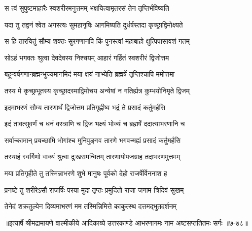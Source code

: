 \twolineshloka
{स त्वं सुपुष्टमाहारैः स्वशरीरमनुत्तमम्}
{भक्षयित्वामृतरसं तेन तृप्तिर्भविष्यति} %

\twolineshloka
{यदा तु तद्वनं श्वेत अगस्त्यः सुमहानृषिः}
{आगमिष्यति दुर्धर्षस्तदा कृच्छ्राद्विमोक्ष्यते} %

\twolineshloka
{स हि तारयितुं सौम्य शक्तः सुरगणानपि}
{किं पुनस्त्वां महाबाहो क्षुत्पिपासावशं गतम्} %

\twolineshloka
{सोऽहं भगवतः श्रुत्वा देवदेवस्य निश्चयम्}
{आहारं गर्हितं स्वशरीरं द्विजोत्तम} %

\twolineshloka
{बहून्वर्षगणान्ब्रह्मन्भुज्यमानमिदं मया}
{क्षयं नाभ्येति ब्रह्मर्षे तृप्तिश्चापि ममोत्तमा} %

\twolineshloka
{तस्य मे कृच्छ्रभूतस्य कृच्छ्रादस्माद्विमोचय}
{अन्येषां न गतिर्ह्यत्र कुम्भयोनिमृते द्विजम्} %

\twolineshloka
{इदमाभरणं सौम्य तारणार्थं द्विजोत्तम}
{प्रतिगृह्णीष्व भद्रं ते प्रसादं कर्तुमर्हसि} %

\twolineshloka
{इदं तावत्सुवर्णं च धनं वस्त्राणि च द्विज}
{भक्ष्यं भोज्यं च ब्रह्मर्षे ददात्याभरणानि च} %

\twolineshloka
{सर्वान्कामान् प्रयच्छामि भोगांश्च मुनिपुङ्गव}
{तारणे भगवन्मह्यं प्रसादं कर्तुमर्हसि} %

\twolineshloka
{तस्याहं स्वर्गिणो वाक्यं श्रुत्वा दुःखसमन्वितम्}
{तारणायोपजग्राह तदाभरणमुत्तमम्} %

\twolineshloka
{मया प्रतिगृहीते तु तस्मिन्नाभरणे शुभे}
{मानुषः पूर्वको देहो राजर्षेर्विननाश ह} %

\twolineshloka
{प्रनष्टे तु शरीरेऽसौ राजर्षिः परया मुदा}
{तृप्तः प्रमुदितो राजा जगाम त्रिदिवं सुखम्} %

\twolineshloka
{तेनेदं शक्रतुल्येन दिव्यमाभरणं मम}
{तस्मिन्निमित्ते काकुत्स्थ दत्तमद्भुतदर्शनम्} %


॥इत्यार्षे श्रीमद्रामायणे वाल्मीकीये आदिकाव्ये उत्तरकाण्डे आभरणागमः नाम अष्टसप्ततितमः सर्गः ॥७-७८॥
